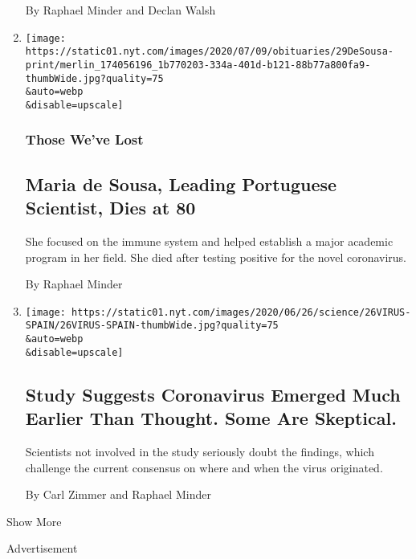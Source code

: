 \begin{enumerate}
  By Raphael Minder and Declan Walsh
\item
  \href{/2020/07/02/obituaries/maria-de-sousa-dead-coronavirus.html}{}

  \texttt{[image: https://static01.nyt.com/images/2020/07/09/obituaries/29DeSousa-print/merlin\_174056196\_1b770203-334a-401d-b121-88b77a800fa9-thumbWide.jpg?quality=75\\\&auto=webp\\\&disable=upscale]}

  \hypertarget{those-weve-lost}{%
  \subsubsection{Those We've Lost}\label{those-weve-lost}}

  \hypertarget{maria-de-sousa-leading-portuguese-scientist-dies-at-80}{%
  \subsection{Maria de Sousa, Leading Portuguese Scientist, Dies at
  80}\label{maria-de-sousa-leading-portuguese-scientist-dies-at-80}}

  She focused on the immune system and helped establish a major academic
  program in her field. She died after testing positive for the novel
  coronavirus.

  By Raphael Minder
\item
  \href{/2020/06/26/health/coronavirus-spain.html}{}

  \texttt{[image: https://static01.nyt.com/images/2020/06/26/science/26VIRUS-SPAIN/26VIRUS-SPAIN-thumbWide.jpg?quality=75\\\&auto=webp\\\&disable=upscale]}

  \hypertarget{study-suggests-coronavirus-emerged-much-earlier-than-thought-some-are-skeptical}{%
  \subsection{Study Suggests Coronavirus Emerged Much Earlier Than
  Thought. Some Are
  Skeptical.}\label{study-suggests-coronavirus-emerged-much-earlier-than-thought-some-are-skeptical}}

  Scientists not involved in the study seriously doubt the findings,
  which challenge the current consensus on where and when the virus
  originated.

  By Carl Zimmer and Raphael Minder
\end{enumerate}

Show More

Advertisement

